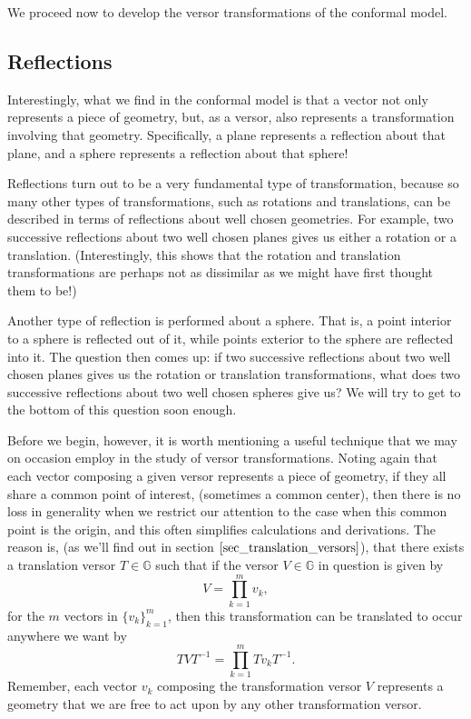 \documentclass[12pt]{article}
\newcommand{\G}{\mathbb{G}}
\begin{document}
We proceed now to develop the versor transformations of the conformal model.

\subsection{Reflections}\label{sec_reflections}

Interestingly, what we find in the conformal model is that a vector
not only represents a piece of geometry, but, as a versor, also represents
a transformation involving that geometry.  Specifically, a plane represents
a reflection about that plane, and a sphere represents a reflection about that
sphere!

Reflections turn out to be a very fundamental type of transformation, because
so many other types of transformations, such as rotations and translations, can be described
in terms of reflections about well chosen geometries.  For example, two
successive reflections about two well chosen planes gives us either a rotation
or a translation.  (Interestingly, this shows that the rotation and translation
transformations are perhaps not as dissimilar as we might have first thought them to be!)

Another type of reflection is performed about a sphere.  That is, a point
interior to a sphere is reflected out of it, while points exterior to the sphere
are reflected into it.  The question then comes up: if two successive
reflections about two well chosen planes gives us the rotation or
translation transformations, what does two successive reflections about
two well chosen spheres give us?  We will try to get to the bottom of this question soon enough.

Before we begin, however, it is worth mentioning a useful technique that we may
on occasion employ in the study of versor transformations.  Noting again that each vector
composing a given versor represents a piece of geometry, if they all share
a common point of interest, (sometimes a common center), then there is no loss
in generality when we restrict our attention to the case when this common point
is the origin, and this often simplifies calculations and derivations.
The reason is, (as we'll find out in section $\eqref{sec_translation_versors}$),
that there exists a translation versor $T\in\G$ such that if the versor $V\in\G$ in question
is given by
\begin{equation*}
V = \prod_{k=1}^m v_k,
\end{equation*}
for the $m$ vectors in $\{v_k\}_{k=1}^m$, then this transformation can be translated
to occur anywhere we want by
\begin{equation*}
TVT^{-1} = \prod_{k=1}^m Tv_kT^{-1}.
\end{equation*}
Remember, each vector $v_k$ composing the transformation versor $V$ represents a geometry
that we are free to act upon by any other transformation versor.
\end{document}

